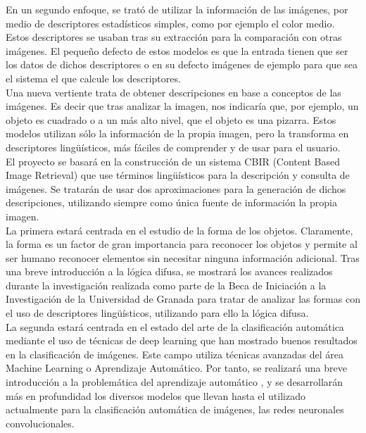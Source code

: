 En un segundo enfoque, se trató de utilizar la información de las imágenes, por medio de descriptores estadísticos simples, como por ejemplo el color medio. Estos descriptores se usaban tras su extracción para la comparación con otras imágenes. El pequeño defecto de estos modelos es que la entrada tienen que ser los datos de dichos descriptores o en su defecto imágenes de ejemplo para que sea el sistema el que calcule los descriptores.\\

Una nueva vertiente trata de obtener descripciones en base a conceptos de las imágenes. Es decir que tras analizar la imagen, nos indicaría que, por ejemplo, un objeto es cuadrado o a un más alto nivel, que el objeto es una pizarra. Estos modelos utilizan sólo la información de la propia imagen, pero la transforma en descriptores lingüísticos, más fáciles de comprender y de usar para el usuario.\\

El proyecto se basará en la construcción de un sistema CBIR (Content Based Image Retrieval) que use términos lingüísticos para la descripción y consulta de imágenes. Se tratarán de usar dos aproximaciones para la generación de dichos descripciones, utilizando siempre como única fuente de información la propia imagen.\\

La primera estará centrada en el estudio de la forma de los objetos. Claramente, la forma es un factor de gran importancia para reconocer los objetos y permite al ser humano reconocer elementos sin necesitar ninguna información adicional. Tras una breve introducción a la lógica difusa\cite{Zadeh-Fuzzy-1965}\cite{Ross}, se mostrará los avances realizados durante la investigación realizada como parte de la Beca de Iniciación a la Investigación de la Universidad de Granada para tratar de analizar las formas con el uso de descriptores lingüísticos, utilizando para ello la lógica difusa.\\

La segunda estará centrada en el estado del arte de la clasificación automática mediante el uso de técnicas de deep learning que han mostrado buenos resultados en la clasificación de imágenes. Este campo utiliza técnicas avanzadas del área Machine Learning o Aprendizaje Automático. Por tanto, se realizará una breve introducción a la problemática del aprendizaje automático \cite{Abu-Mostafa:2012:LD:2207825}, y se desarrollarán más en profundidad los diversos modelos que llevan hasta el utilizado actualmente para la clasificación automática de imágenes, las redes neuronales convolucionales\cite{Bishop:2006:PRM:1162264}\cite{lecun-89e}.\\


